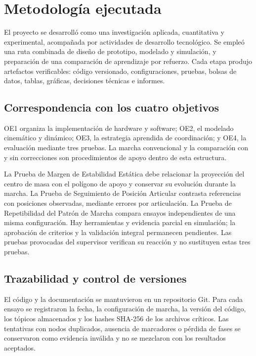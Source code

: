 \chapter{Metodología ejecutada}

El proyecto se desarrolló como una investigación aplicada, cuantitativa y
experimental, acompañada por actividades de desarrollo tecnológico. Se empleó
una ruta combinada de diseño de prototipo, modelado y simulación, y preparación
de una comparación de aprendizaje por refuerzo. Cada etapa produjo artefactos
verificables: código versionado, configuraciones, pruebas, bolsas de datos,
tablas, gráficas, decisiones técnicas e informes.

\section{Correspondencia con los cuatro objetivos}

OE1 organiza la implementación de hardware y software; OE2, el modelado
cinemático y dinámico; OE3, la estrategia aprendida de coordinación; y OE4,
la evaluación mediante tres pruebas. La marcha convencional y la comparación
con y sin correcciones son procedimientos de apoyo dentro de esta estructura.

La Prueba de Margen de Estabilidad Estática debe relacionar la proyección del
centro de masa con el polígono de apoyo y conservar su evolución durante la
marcha. La Prueba de Seguimiento de Posición Articular contrasta referencias
con posiciones observadas, mediante errores por articulación. La Prueba de
Repetibilidad del Patrón de Marcha compara ensayos independientes de una misma
configuración. Hay herramientas y evidencia parcial en simulación; la aprobación
de criterios y la validación integral permanecen pendientes. Las pruebas
provocadas del supervisor verifican su reacción y no sustituyen estas tres pruebas.

\section{Trazabilidad y control de versiones}

El código y la documentación se mantuvieron en un repositorio Git. Para cada
ensayo se registraron la fecha, la configuración de marcha, la versión del
código, los tópicos almacenados y los hashes SHA-256 de los archivos críticos.
Las tentativas con nodos duplicados, ausencia de marcadores o pérdida de fases
se conservaron como evidencia inválida y no se mezclaron con los resultados
aceptados.

